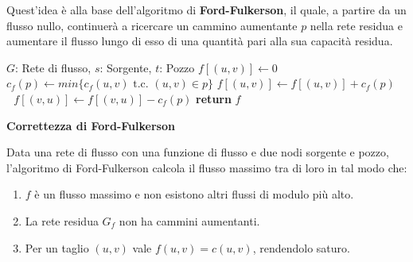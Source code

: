 \noindent Quest'idea è alla base dell'algoritmo di \textbf{Ford-Fulkerson}, il quale, a partire da un flusso nullo, continuerà a ricercare un cammino
aumentante $p$ nella rete residua e aumentare il flusso lungo di esso di una quantità pari alla sua capacità residua.
\begin{algorithm}[h]
	\caption{ford-fulkerson(G, s, t)}
	\begin{algorithmic}[i]
		\Require $G$: Rete di flusso, $s$: Sorgente, $t$: Pozzo
		\State $f[(u,v)]\gets 0$
		\EndFor
		\State $c_f(p) \gets min\{c_f(u,v) \text{ t.c. } (u,v)\in p\}$ 
		 
		\State $f[(u,v)]\gets f[(u,v)] + c_f(p)$
		\Else $\text{ }f[(v,u)]\gets f[(v,u)] - c_f(p)$
		\EndIf
		\EndFor
		\EndWhile
		\State \textbf{return} $f$
	\end{algorithmic}
\end{algorithm}

\begin{teorema}
	\textbf{Correttezza di Ford-Fulkerson}\par
	\noindent Data una rete di flusso con una funzione di flusso e due nodi sorgente e pozzo, l'algoritmo di Ford-Fulkerson calcola il flusso massimo
	tra di loro in tal modo che: \begin{enumerate}
		\item $f$ è un flusso massimo e non esistono altri flussi di modulo più alto.
		\item La rete residua $G_f$ non ha cammini aumentanti.
		\item Per un taglio $(u,v)$ vale $f(u,v) = c(u,v)$, rendendolo saturo.
\end{enumerate}
\end{teorema}

